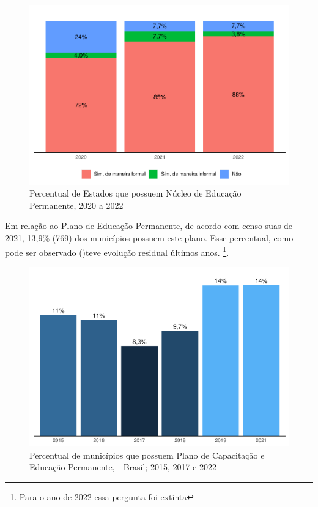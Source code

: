 \documentclass[
  brazilian]{report}
\begin{document}
\begin{figure}
\includegraphics{Censo-SUAS-2022_files/figure-latex/NUEP-1} \caption[Percentual de Estados que possuem Núcleo de Educação Permanente, 2020 a 2022]{Percentual de Estados que possuem Núcleo de Educação Permanente, 2020 a 2022}\label{fig:NUEP}
\end{figure}

Em relação ao Plano de Educação Permanente, de acordo com censo suas de
2021, 13,9\% (769) dos municípios possuem este plano. Esse percentual,
como pode ser observado ()teve evolução residual
últimos anos. \footnote{Para o ano de 2022 essa pergunta foi extinta}.

\begin{figure}
\includegraphics{Censo-SUAS-2022_files/figure-latex/PNEP_Munic-1} \caption[Percentual de municípios que possuem Plano de Capacitação e Educação Permanente, - Brasil]{Percentual de municípios que possuem Plano de Capacitação e Educação Permanente, - Brasil; 2015, 2017 e 2022}\label{fig:PNEP_Munic}
\end{figure}
\end{document}
